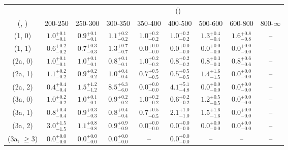 \begin{table}[h!]
\tiny
\centering
{}
\begin{tabular}
{ccccccccc}
	\hline\hline
&	& \multicolumn{8}{c}{\scalht (\gev)} \\ 
	 (\njet,  \nb) & 200-250 & 250-300 & 300-350 & 350-400 & 400-500 & 500-600 & 600-800 & 800-$\infty$ \\ [0.8ex] 
\hline
	(1, 0) & $1.0^{+ 0.1 }_{- 0.1 }$ & $0.9^{+ 0.1 }_{- 0.1 }$ & $1.1^{+ 0.2 }_{- 0.2 }$ & $1.0^{+ 0.2 }_{- 0.2 }$ & $1.0^{+ 0.2 }_{- 0.2 }$ & $1.3^{+ 0.4 }_{- 0.4 }$ & $1.6^{+ 0.8 }_{- 0.8 }$ & -- \\[0.5ex] 
	(1, 1) & $0.6^{+ 0.2 }_{- 0.2 }$ & $0.7^{+ 0.3 }_{- 0.3 }$ & $1.3^{+ 0.7 }_{- 0.7 }$ & $0.0^{+ 0.0 }_{- 0.0 }$ & $0.0^{+ 0.0 }_{- 0.0 }$ & $0.0^{+ 0.0 }_{- 0.0 }$ & $0.0^{+ 0.0 }_{- 0.0 }$ & -- \\[0.5ex] 
	(2a, 0) & $1.0^{+ 0.1 }_{- 0.1 }$ & $1.0^{+ 0.1 }_{- 0.1 }$ & $0.8^{+ 0.1 }_{- 0.1 }$ & $1.0^{+ 0.2 }_{- 0.2 }$ & $0.8^{+ 0.2 }_{- 0.2 }$ & $0.8^{+ 0.3 }_{- 0.3 }$ & $0.8^{+ 0.6 }_{- 0.6 }$ & -- \\[0.5ex] 
	(2a, 1) & $1.1^{+ 0.2 }_{- 0.2 }$ & $0.9^{+ 0.2 }_{- 0.2 }$ & $1.0^{+ 0.4 }_{- 0.4 }$ & $0.7^{+ 0.5 }_{- 0.5 }$ & $0.5^{+ 0.5 }_{- 0.5 }$ & $1.4^{+ 1.6 }_{- 1.5 }$ & $0.0^{+ 0.0 }_{- 0.0 }$ & -- \\[0.5ex] 
	(2a, 2) & $0.4^{+ 0.4 }_{- 0.4 }$ & $1.5^{+ 1.2 }_{- 1.2 }$ & $8.5^{+ 6.3 }_{- 6.0 }$ & $0.0^{+ 0.0 }_{- 0.0 }$ & $4.1^{+ 5.1 }_{- 4.8 }$ & $0.0^{+ 0.0 }_{- 0.0 }$ & $0.0^{+ 0.0 }_{- 0.0 }$ & -- \\[0.5ex] 
	(3a, 0) & $1.0^{+ 0.2 }_{- 0.2 }$ & $1.0^{+ 0.1 }_{- 0.1 }$ & $0.9^{+ 0.2 }_{- 0.2 }$ & $1.0^{+ 0.2 }_{- 0.2 }$ & $0.6^{+ 0.2 }_{- 0.2 }$ & $1.2^{+ 0.5 }_{- 0.5 }$ & $0.0^{+ 0.0 }_{- 0.0 }$ & -- \\[0.5ex] 
	(3a, 1) & $0.8^{+ 0.4 }_{- 0.4 }$ & $0.9^{+ 0.3 }_{- 0.3 }$ & $0.8^{+ 0.4 }_{- 0.4 }$ & $0.7^{+ 0.5 }_{- 0.5 }$ & $2.1^{+ 1.0 }_{- 1.0 }$ & $1.5^{+ 1.6 }_{- 1.6 }$ & $0.0^{+ 0.0 }_{- 0.0 }$ & -- \\[0.5ex] 
	(3a, 2) & $3.0^{+ 1.5 }_{- 1.5 }$ & $1.1^{+ 0.8 }_{- 0.8 }$ & $0.9^{+ 0.9 }_{- 0.9 }$ & $0.0^{+ 0.0 }_{- 0.0 }$ & $0.0^{+ 0.0 }_{- 0.0 }$ & $0.0^{+ 0.0 }_{- 0.0 }$ & $0.0^{+ 0.0 }_{- 0.0 }$ & -- \\[0.5ex] 
	(3a, $\ge3$) & $0.0^{+ 0.0 }_{- 0.0 }$ & $0.0^{+ 0.0 }_{- 0.0 }$ & $0.0^{+ 0.0 }_{- 0.0 }$ & -- & $0.0^{+ 0.0 }_{- 0.0 }$ & -- & -- & -- \\[0.5ex] 

\end{tabular}
\end{table}
